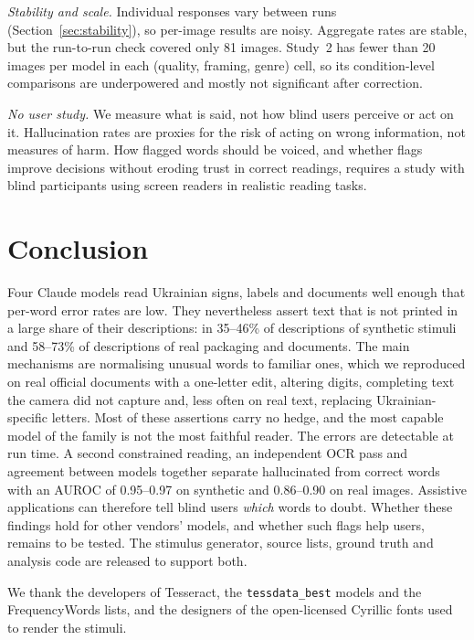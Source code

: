 \documentclass[pdflatex,sn-mathphys-num]{sn-jnl}%
\theoremstyle{thmstyleone}%
\theoremstyle{thmstyletwo}%
\theoremstyle{thmstylethree}%
\newcommand{\RangeAucComb}{0.95--0.97}
\newcommand{\RangeImg}{35--46}
\newcommand{\RealRangeAucComb}{0.86--0.90}
\newcommand{\RealRangeImg}{58--73}
\newcommand{\StabN}{81}
\begin{document}
\emph{Stability and scale.} Individual responses vary between runs (Section~\ref{sec:stability}), so per-image results are noisy. Aggregate rates are stable, but the run-to-run check covered only \StabN{} images. Study~2 has fewer than 20 images per model in each (quality, framing, genre) cell, so its condition-level comparisons are underpowered and mostly not significant after correction.

\emph{No user study.} We measure what is said, not how blind users perceive or act on it. Hallucination rates are proxies for the risk of acting on wrong information, not measures of harm. How flagged words should be voiced, and whether flags improve decisions without eroding trust in correct readings, requires a study with blind participants using screen readers in realistic reading tasks.

\section{Conclusion}\label{sec:conclusion}

Four Claude models read Ukrainian signs, labels and documents well enough that per-word error rates are low. They nevertheless assert text that is not printed in a large share of their descriptions: in \RangeImg\% of descriptions of synthetic stimuli and \RealRangeImg\% of descriptions of real packaging and documents. The main mechanisms are normalising unusual words to familiar ones, which we reproduced on real official documents with a one-letter edit, altering digits, completing text the camera did not capture and, less often on real text, replacing Ukrainian-specific letters. Most of these assertions carry no hedge, and the most capable model of the family is not the most faithful reader. The errors are detectable at run time. A second constrained reading, an independent OCR pass and agreement between models together separate hallucinated from correct words with an AUROC of \RangeAucComb{} on synthetic and \RealRangeAucComb{} on real images. Assistive applications can therefore tell blind users \emph{which} words to doubt. Whether these findings hold for other vendors' models, and whether such flags help users, remains to be tested. The stimulus generator, source lists, ground truth and analysis code are released to support both.


\backmatter


We thank the developers of Tesseract, the \texttt{tessdata\_best} models and the FrequencyWords lists, and the designers of the open-licensed Cyrillic fonts used to render the stimuli.
\end{document}
